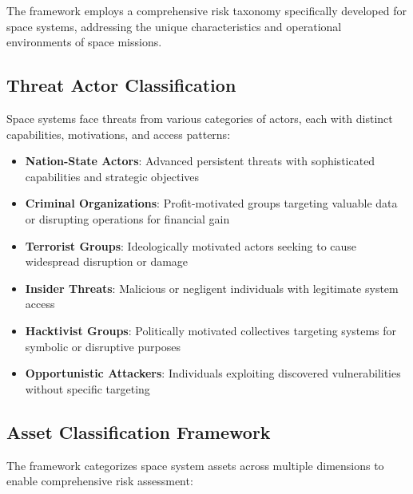 \documentclass[binding=0.6cm]{sapthesis}
\begin{document}
The framework employs a comprehensive risk taxonomy specifically developed for space systems, addressing the unique characteristics and operational environments of space missions.

\subsection{Threat Actor Classification}

Space systems face threats from various categories of actors, each with distinct capabilities, motivations, and access patterns:

\begin{itemize}
    \item \textbf{Nation-State Actors}: Advanced persistent threats with sophisticated capabilities and strategic objectives
    \item \textbf{Criminal Organizations}: Profit-motivated groups targeting valuable data or disrupting operations for financial gain
    \item \textbf{Terrorist Groups}: Ideologically motivated actors seeking to cause widespread disruption or damage
    \item \textbf{Insider Threats}: Malicious or negligent individuals with legitimate system access
    \item \textbf{Hacktivist Groups}: Politically motivated collectives targeting systems for symbolic or disruptive purposes
    \item \textbf{Opportunistic Attackers}: Individuals exploiting discovered vulnerabilities without specific targeting
\end{itemize}

\subsection{Asset Classification Framework}

The framework categorizes space system assets across multiple dimensions to enable comprehensive risk assessment:
\end{document}
